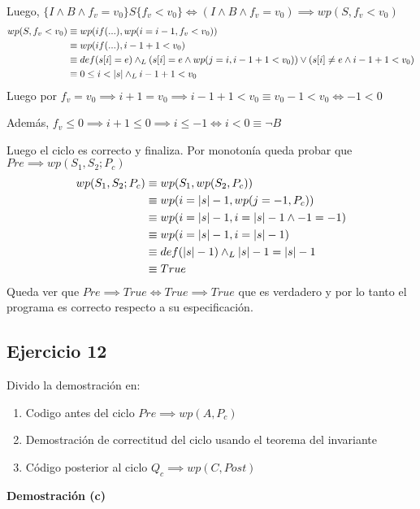 Luego, $ \{ I \wedge B \wedge f_v = v_0 \} S \{ f_v < v_0 \} \iff (I \wedge B \wedge f_v = v_0) \implies wp(S, f_v < v_0) $
\begin{align*}
    wp(S, f_v < v_0) &\equiv wp(if(...), wp(i=i-1, f_v < v_0)) \\
    &\equiv wp(if(...), i-1+1 < v_0) \\
    &\equiv def(s[i]=e) \land _L (s[i]=e \wedge wp(j=i, i-1+1 < v_0)) \vee (s[i] \neq e \wedge i-1+1 < v_0) \\
    &\equiv 0 \leq i < |s| \land _L i-1+1 < v_0 \\
\end{align*}
Luego por $ f_v = v_0 \implies i+1 = v_0 \implies i-1+1 < v_0 \equiv v_0 -1 < v_0 \iff -1 < 0 $

Además, $ f_v \leq 0 \implies i+1 \leq 0 \implies i \leq -1 \iff i < 0 \equiv \neg B $

Luego el ciclo es correcto y finaliza. Por monotonía queda probar que $ Pre \implies wp(S_1, S_2; P_c) $
\begin{align*}
    wp(S_1, S_2; P_c) &\equiv wp(S_1, wp(S_2, P_c)) \\
    &\equiv wp(i = |s|-1, wp(j=-1, P_c)) \\
    &\equiv wp(i = |s|-1, i = |s| -1 \wedge -1=-1) \\
    &\equiv wp(i = |s|-1, i = |s| -1) \\
    &\equiv def(|s|-1) \land _L |s| -1 = |s| -1 \\
    &\equiv True \\
\end{align*}
Queda ver que $ Pre \implies True \iff True \implies True $ que es verdadero y por lo tanto el programa es correcto respecto a su especificación.

\subsection{Ejercicio 12}

Divido la demostración en:
\begin{enumerate}[label=(\alph*)]
    \item Codigo antes del ciclo $ Pre \implies wp(A, P_c) $
    \item Demostración de correctitud del ciclo usando el teorema del invariante
    \item Código posterior al ciclo $ Q_c \implies wp(C, Post) $
\end{enumerate}

\textbf{Demostración (c)}

